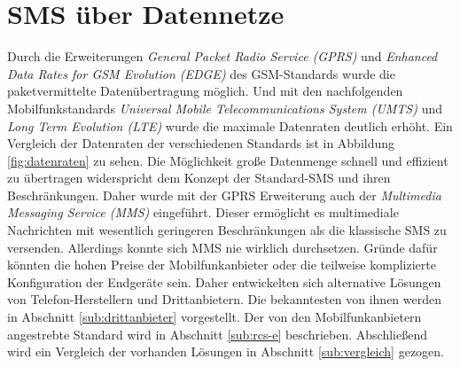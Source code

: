\documentclass[german,12pt,a4paper]{article}
\begin{document}





\section{SMS über Datennetze} %
\label{sec:datennetze}

 Durch die Erweiterungen \textit{General Packet Radio Service
(GPRS)} und \textit{Enhanced Data Rates for GSM Evolution (EDGE)} des GSM-Standards wurde die
paketvermittelte Datenübertragung möglich. Und mit den nachfolgenden Mobilfunkstandards
\textit{Universal Mobile Telecommunications System (UMTS)} und \textit{Long Term
    Evolution (LTE)} wurde die maximale Datenraten deutlich erhöht. Ein Vergleich der Datenraten
der verschiedenen Standards ist in Abbildung \ref{fig:datenraten} zu sehen. Die Möglichkeit
große Datenmenge schnell und effizient zu übertragen widerspricht dem Konzept der Standard-SMS
und ihren Beschränkungen. Daher wurde mit der GPRS Erweiterung auch der \textit{Multimedia
    Messaging Service (MMS)} eingeführt. Dieser ermöglicht es multimediale Nachrichten
mit wesentlich geringeren Beschränkungen als die klassische SMS zu versenden. Allerdings
konnte sich MMS nie wirklich durchsetzen. Gründe dafür könnten die hohen Preise der
Mobilfunkanbieter oder die teilweise komplizierte Konfiguration der Endgeräte sein. Daher
entwickelten sich alternative Lösungen von Telefon-Herstellern und Drittanbietern. Die
bekanntesten von ihnen
werden in Abschnitt \ref{sub:drittanbieter} vorgestellt. Der von den
Mobilfunkanbietern angestrebte Standard wird in Abschnitt \ref{sub:rcs-e} beschrieben.
Abschließend wird ein Vergleich der vorhanden Lösungen in Abschnitt \ref{sub:vergleich}
gezogen.
\end{document}
